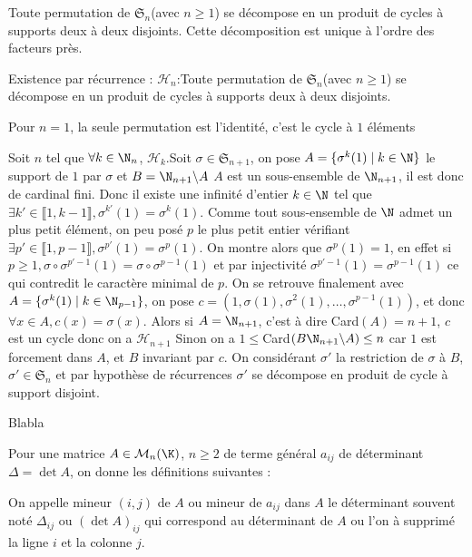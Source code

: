 \begin{theoreme}
    Toute permutation de $\mathfrak{S}_n$(avec $n\geq1$) se décompose en un produit de cycles à supports deux à deux disjoints. Cette décomposition est unique à l'ordre des facteurs près.
    
    \tcblower
    Existence par récurrence : $\mathcal{H}_n$:Toute permutation de $\mathfrak{S}_n$(avec $n\geq1$) se décompose en un produit de cycles à supports deux à deux disjoints.
    
    Pour $n=1$, la seule permutation est l'identité, c'est le cycle à $1$ éléments

    Soit $n$ tel que $\forall k\in\N_n$, $\mathcal{H}_k$.Soit $\sigma\in\mathfrak{S}_{n+1}$, on pose $A=\{\sigma^k(1)\mid k\in\N\}$ le support de $1$ par $\sigma$ et $B=\N_{n+1}\backslash A$
    $A$ est un sous-ensemble de $\N_{n+1}$, il est donc de cardinal fini. Donc il existe une infinité d'entier $k\in\N$ tel que $\exists k'\in\llbracket 1,k-1\rrbracket,\sigma^{k'}(1)=\sigma^k(1)$.
    Comme tout sous-ensemble de $\N$ admet un plus petit élément, on peu posé $p$ le plus petit entier vérifiant $\exists p'\in\llbracket 1,p-1\rrbracket,\sigma^{p'}(1)=\sigma^p(1)$. On montre alors que $\sigma^p(1)=1$, en effet si $p\geq 1,\sigma\circ\sigma^{p'-1}(1)=\sigma\circ\sigma^{p-1}(1)$ et par injectivité $\sigma^{p'-1}(1)=\sigma^{p-1}(1)$ ce qui contredit le caractère minimal de $p$.
    On se retrouve finalement avec $A=\{\sigma^k(1)\mid k\in\N_{p-1}\}$, on pose $c=(1,\sigma(1),\sigma^2(1),\dots,\sigma^{p-1}(1))$, et donc $\forall x\in A, c(x)=\sigma(x)$.
    Alors si $A=\N_{n+1}$, c'est à dire Card$(A)=n+1$, $c$ est un cycle donc on a $\mathcal{H}_{n+1}$
    Sinon on a $1\leq$Card$(B\N_{n+1}\backslash A)\leq n$ car $1$ est forcement dans $A$, et $B$ invariant par $c$. On considérant $\sigma'$ la restriction de $\sigma$ à $B$, $\sigma'\in\mathfrak{S}_n$ et par hypothèse de récurrences $\sigma'$ se décompose en produit de cycle à support disjoint.
\end{theoreme}
\begin{theoreme}
    Blabla
\end{theoreme}
Pour une matrice $A\in\mathcal{M}_n(\K)$, $n\geq2$ de terme général $a_{ij}$ de déterminant $\Delta=\det A$, on donne les définitions suivantes :\\
\begin{defini}
On appelle mineur $(i,j)$ de $A$ ou mineur de $a_{ij}$ dans $A$ le déterminant souvent noté $\Delta_{ij}$ ou $(\det A)_{ij}$ qui correspond au déterminant de $A$ ou l'on à supprimé la ligne $i$ et la colonne $j$.\\
\end{defini}
